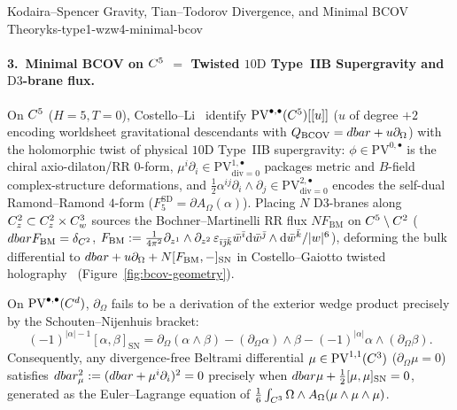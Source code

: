 \begin{zkmodule}{Kodaira--Spencer Gravity, Tian--Todorov Divergence, and Minimal BCOV Theory}{ks-type1-wzw4-minimal-bcov}
\paragraph{3.\ Minimal BCOV on $C^5$ $=$ Twisted $10\mathrm{D}$ Type~IIB Supergravity and $\mathrm{D}3$-brane flux.}
On $C^5$ ($H=5, T=0$), Costello--Li~\cite{CL19} identify $\mathrm{PV}^{\bullet,\bullet}(C^5)[[u]]$ ($u$ of degree $+2$ encoding worldsheet gravitational descendants with $Q_{\mathrm{BCOV}} = dbar + u\partial_\Omega$) with the holomorphic twist of physical $10\mathrm{D}$ Type~IIB supergravity: $\phi \in \mathrm{PV}^{0,\bullet}$ is the chiral axio-dilaton/RR $0$-form, $\mu^i\partial_i \in \mathrm{PV}^{1,\bullet}_{\mathrm{div}=0}$ packages metric and $B$-field complex-structure deformations, and $\frac{1}{2}\alpha^{ij}\partial_i\wedge\partial_j \in \mathrm{PV}^{2,\bullet}_{\mathrm{div}=0}$ encodes the self-dual Ramond--Ramond $4$-form ($F_5^{\mathrm{SD}} = \partial A_\Omega(\alpha)$). Placing $N$ $\mathrm{D}3$-branes along $C^2_z \subset C^2_z\times C^3_w$ sources the Bochner--Martinelli RR flux $N F_{\mathrm{BM}}$ on $C^5\setminus C^2$ ($dbar F_{\mathrm{BM}} = \delta_{C^2}$, $F_{\mathrm{BM}} := \frac{1}{4\pi^2}\partial_{z^1}\wedge\partial_{z^2}\,\varepsilon_{\bar{\imath}\bar{\jmath}\bar{k}}\bar{w}^{\bar{\imath}}\mathrm{d}\bar{w}^{\bar{\jmath}}\wedge\mathrm{d}\bar{w}^{\bar{k}}/|w|^6$), deforming the bulk differential to $dbar + u\partial_\Omega + N[F_{\mathrm{BM}}, -]_{\mathrm{SN}}$ in Costello--Gaiotto twisted holography~\cite{CG18} (Figure~\ref{fig:bcov-geometry}).
\end{zkmodule}

\begin{lemma}
\label{lem:tian-todorov}
On $\mathrm{PV}^{\bullet,\bullet}(C^d)$, $\partial_\Omega$ fails to be a derivation of the exterior wedge product precisely by the Schouten--Nijenhuis bracket:
\begin{equation}
\label{eq:tian-todorov}
(-1)^{|\alpha|-1}[\alpha, \beta]_{\mathrm{SN}} = \partial_\Omega(\alpha\wedge\beta) - (\partial_\Omega\alpha)\wedge\beta - (-1)^{|\alpha|}\alpha\wedge(\partial_\Omega\beta).
\end{equation}
Consequently, any divergence-free Beltrami differential $\mu \in \mathrm{PV}^{1,1}(C^3)$ ($\partial_\Omega\mu = 0$) satisfies $dbar_\mu^2 := (dbar + \mu^i\partial_i)^2 = 0$ precisely when $dbar\mu + \frac{1}{2}[\mu,\mu]_{\mathrm{SN}} = 0$, generated as the Euler--Lagrange equation of $\frac{1}{6}\int_{C^3}\Omega\wedge A_\Omega(\mu\wedge\mu\wedge\mu)$.
\end{lemma}

